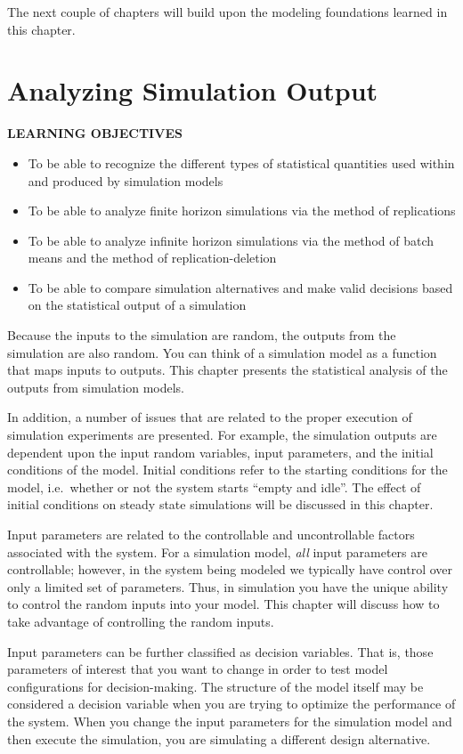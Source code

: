 \documentclass[
]{book}
\theoremstyle{definition}
\theoremstyle{definition}
\theoremstyle{definition}
\theoremstyle{definition}
\theoremstyle{remark}
\begin{document}
The next couple of chapters will build upon the modeling foundations
learned in this chapter.

\hypertarget{simoa}{%
\chapter{Analyzing Simulation Output}\label{simoa}}

\textbf{\textsc{LEARNING OBJECTIVES}}

\begin{itemize}
\item
  To be able to recognize the different types of statistical
  quantities used within and produced by simulation models
\item
  To be able to analyze finite horizon simulations via the method of
  replications
\item
  To be able to analyze infinite horizon simulations via the method of
  batch means and the method of replication-deletion
\item
  To be able to compare simulation alternatives and make valid
  decisions based on the statistical output of a simulation
\end{itemize}

Because the inputs to the simulation are random, the outputs from the simulation
are also random. You can think of a simulation model as
a function that maps inputs to outputs. This chapter presents the
statistical analysis of the outputs from simulation models.

In addition, a number of issues that are related to the proper execution
of simulation experiments are presented. For example, the simulation
outputs are dependent upon the input random variables, input parameters,
and the initial conditions of the model. Initial conditions refer to the
starting conditions for the model, i.e.~whether or not the system starts
``empty and idle''. The effect of initial conditions on steady state
simulations will be discussed in this chapter.

Input parameters are related to the controllable and uncontrollable
factors associated with the system. For a simulation model, \emph{all} input
parameters are controllable; however, in the system being modeled we
typically have control over only a limited set of parameters. Thus, in
simulation you have the unique ability to control the random inputs into
your model. This chapter will discuss how to take advantage of
controlling the random inputs.

Input parameters can be further classified as decision variables. That
is, those parameters of interest that you want to change in order to
test model configurations for decision-making. The structure of the
model itself may be considered a decision variable when you are trying
to optimize the performance of the system. When you change the input
parameters for the simulation model and then execute the simulation, you
are simulating a different design alternative.
\end{document}
